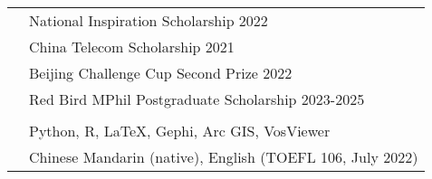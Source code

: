 \documentclass[letterpaper, 11pt]{article}
\begin{document}
\begin{longtable}{p{1.3in}p{4.8in}}




{\color{RoyalBlue}{Selected Honors }} 
&  National Inspiration Scholarship  \hfill 2022\\
{\color{RoyalBlue}{and Scholarships}} 
& China Telecom Scholarship \hfill 2021 \\
& Beijing Challenge Cup Second Prize \hfill 2022 \\
& Red Bird MPhil Postgraduate Scholarship \hfill 2023-2025 \\
& \\


{\color{RoyalBlue}{Skills}} 
&Python, R, LaTeX, Gephi, Arc GIS, VosViewer\\

{\color{RoyalBlue}{Languages}} 
&Chinese Mandarin (native), English (TOEFL 106, July 2022) \\




\end{longtable}
\end{document}
